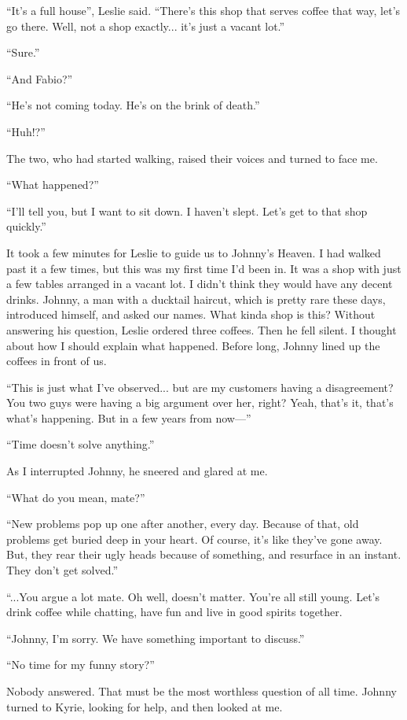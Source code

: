\documentclass[oneside]{book}
\begin{document}
“It’s a full house”, Leslie said. “There’s this shop that serves coffee that way, let’s go there. Well, not a shop exactly... it’s just a vacant lot.”

“Sure.”

“And Fabio?”

“He’s not coming today. He’s on the brink of death.”

“Huh!?”

The two, who had started walking, raised their voices and turned to face me.

“What happened?”

“I’ll tell you, but I want to sit down. I haven’t slept. Let’s get to that shop quickly.”

It took a few minutes for Leslie to guide us to Johnny’s Heaven. I had walked past it a few times, but this was my first time I’d been in. It was a shop with just a few tables arranged in a vacant lot. I didn’t think they would have any decent drinks. Johnny, a man with a ducktail haircut, which is pretty rare these days, introduced himself, and asked our names. What kinda shop is this? Without answering his question, Leslie ordered three coffees. Then he fell silent. I thought about how I should explain what happened. Before long, Johnny lined up the coffees in front of us.

“This is just what I’ve observed... but are my customers having a disagreement? You two guys were having a big argument over her, right? Yeah, that’s it, that’s what’s happening. But in a few years from now—”

“Time doesn’t solve anything.”

As I interrupted Johnny, he sneered and glared at me.

“What do you mean, mate?”

“New problems pop up one after another, every day. Because of that, old problems get buried deep in your heart. Of course, it’s like they’ve gone away. But, they rear their ugly heads because of something, and resurface in an instant. They don’t get solved.”

“...You argue a lot mate. Oh well, doesn’t matter. You’re all still young. Let’s drink coffee while chatting, have fun and live in good spirits together.

“Johnny, I’m sorry. We have something important to discuss.”

“No time for my funny story?”

Nobody answered. That must be the most worthless question of all time. Johnny turned to Kyrie, looking for help, and then looked at me.
\end{document}
